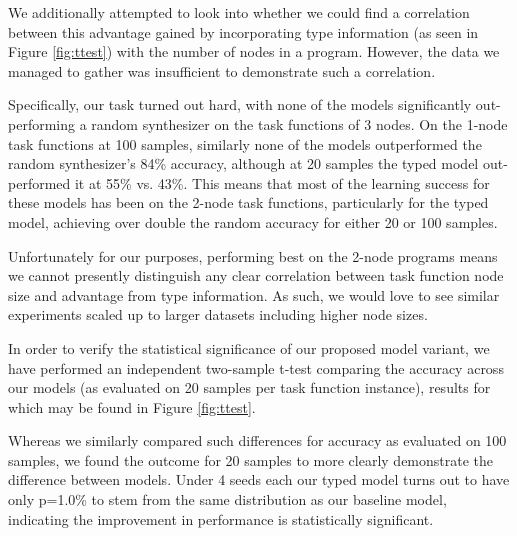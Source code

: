 \documentclass{article}
\begin{document}
We additionally attempted to look into whether we could find a correlation between this
advantage gained by incorporating type information (as seen in Figure \ref{fig:ttest}) with the number of nodes in a program.
However, the data we managed to gather was insufficient to demonstrate such a correlation.


Specifically, our task turned out hard,
with none of the models significantly out-performing a random synthesizer
on the task functions of 3 nodes.
On the 1-node task functions at 100 samples,
similarly none of the models outperformed the random synthesizer's 84\% accuracy,
although at 20 samples the typed model out-performed it at 55\% vs. 43\%.
This means that most of the learning success for these models has been on the 2-node task functions,
particularly for the typed model, achieving over double the random accuracy for either 20 or 100 samples.

Unfortunately for our purposes, performing best on the 2-node programs
means we cannot presently distinguish any clear correlation between
task function node size and advantage from type information.
As such, we would love to see similar experiments scaled up to larger datasets including higher node sizes.

In order to verify the statistical significance of our proposed model variant,
we have performed an independent two-sample t-test comparing the accuracy across our models
(as evaluated on 20 samples per task function instance),
results for which may be found in Figure \ref{fig:ttest}.

Whereas we similarly compared such differences for accuracy as evaluated on 100 samples,
we found the outcome for 20 samples to more clearly demonstrate the difference between models.
Under 4 seeds each our typed model turns out to have only p=1.0\%
to stem from the same distribution as our baseline model,
indicating the improvement in performance is statistically significant.
\end{document}

